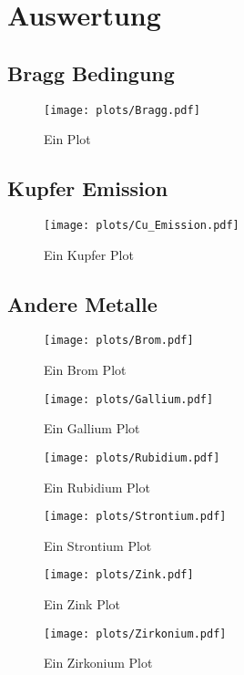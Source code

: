 \section{Auswertung}
\label{sec:Auswertung}
\subsection{Bragg Bedingung}
\begin{figure}
    \centering
    \texttt{[image: plots/Bragg.pdf]}
    \caption{Ein Plot}
    \label{fig:Bragg}
\end{figure}

\subsection{Kupfer Emission}
\begin{figure}
    \centering
    \texttt{[image: plots/Cu\_Emission.pdf]}
    \caption{Ein Kupfer Plot}
    \label{fig:Cu_Emission}
\end{figure}

\subsection{Andere Metalle}
\begin{figure}
    \centering
    \texttt{[image: plots/Brom.pdf]}
    \caption{Ein Brom Plot}
    \label{fig:Brom}
\end{figure}
\begin{figure}
    \centering
    \texttt{[image: plots/Gallium.pdf]}
    \caption{Ein Gallium Plot}
    \label{fig:Gallium}
\end{figure}
\begin{figure}
    \centering
    \texttt{[image: plots/Rubidium.pdf]}
    \caption{Ein Rubidium Plot}
    \label{fig:Rubidium}
\end{figure}
\begin{figure}
    \centering
    \texttt{[image: plots/Strontium.pdf]}
    \caption{Ein Strontium Plot}
    \label{fig:Strontium}
\end{figure}
\begin{figure}
    \centering
    \texttt{[image: plots/Zink.pdf]}
    \caption{Ein Zink Plot}
    \label{fig:Zink}
\end{figure}
\begin{figure}
    \centering
    \texttt{[image: plots/Zirkonium.pdf]}
    \caption{Ein Zirkonium Plot}
    \label{fig:Zirkonium}
\end{figure}